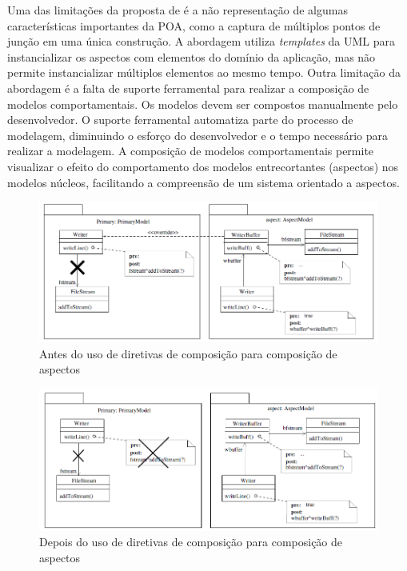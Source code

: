 Uma das limitações da proposta de \cite{france:06} é a não representação de algumas características importantes da POA, como a captura de múltiplos
pontos de junção em uma única construção. A abordagem utiliza \textit{templates} da UML para instancializar os aspectos com elementos do domínio da
aplicação, mas não permite instancializar múltiplos elementos ao mesmo tempo. Outra limitação da abordagem é a falta de suporte ferramental para
realizar a composição de modelos comportamentais. Os modelos devem ser compostos manualmente pelo desenvolvedor. O suporte ferramental automatiza
parte do processo de modelagem, diminuindo o esforço do desenvolvedor e o tempo necessário para realizar a modelagem. A composição de modelos
comportamentais permite visualizar o efeito do comportamento dos modelos entrecortantes (aspectos) nos modelos núcleos, facilitando a compreensão de
um sistema orientado a aspectos.

\begin{landscape}
\begin{figure}
	\centering
	\includegraphics{img/clarke_1.png}
	\caption{Antes do uso de diretivas de composição para composição de aspectos}\label{fig:clarke_1}
\end{figure}
\end{landscape}

\begin{landscape}
\begin{figure}
	\centering
	\includegraphics{img/clarke_2.png}
	\caption{Depois do uso de diretivas de composição para composição de aspectos}\label{fig:clarke_2}
\end{figure}
\end{landscape}

